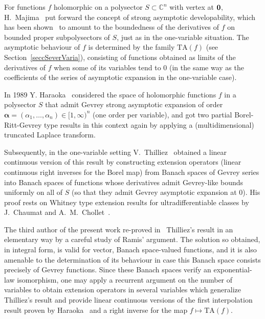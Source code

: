 \documentclass[11pt,a4paper,leqno]{article}
\theoremstyle{plain}
\theoremstyle{definition}
\def\C{\mathbb{C}}
\def\a{\alpha}
\def\balpha{\boldsymbol{\alpha}}
\begin{document}
For functions $f$ holomorphic on a polysector $S\subset\C^n$ with vertex at $\bf 0$, H.~Majima~\cite{Majima1,Majima2} put forward
the concept of strong asymptotic developability, which has been shown~\cite{hernandez,galindosanz} to amount to the boundedness of the
derivatives of $f$ on bounded proper subpolysectors of $S$, just as in the one-variable situation.
The asymptotic behaviour of $f$ is determined by the family $\mathrm{TA}(f)$ (see Section~\ref{seccSeverVaria}),
consisting of functions obtained as limits of the derivatives of $f$
when some of its variables tend to 0 (in the same way as the coefficients of the series of asymptotic expansion in the one-variable case).

In 1989 Y. Haraoka~\cite{Haraoka} considered the space of holomorphic functions $f$ in a polysector $S$ that admit Gevrey strong asymptotic expansion of order
$\balpha=(\a_1,\ldots,\a_n)\in[1,\infty)^n$ (one order per variable), and got two partial Borel-Ritt-Gevrey type results in this context again by applying a
(multidimensional) truncated Laplace transform.

Subsequently, in the one-variable setting V.~Thilliez~\cite[Theorem 1.3]{Thilliez1} obtained a linear continuous version of this result by constructing
extension operators (linear continuous right inverses for the Borel map) from Banach spaces of Gevrey series into Banach
spaces of functions whose derivatives admit Gevrey-like bounds uniformly on all of $S$ (so that they admit Gevrey asymptotic expansion at 0). His proof rests
on Whitney type extension results for ultradifferentiable classes by J.~Chaumat and A.~M.~Chollet~\cite{ChaumatChollet}.

The third author of the present work re-proved in~\cite{javier} Thilliez's result
in an elementary way by a careful study of Ramis' argument. The solution so obtained, in integral form,  is valid for vector, Banach space-valued functions, and it is also amenable to the determination of its
behaviour in case this Banach space consists precisely of Gevrey functions. Since these Banach spaces verify an exponential-law isomorphism, one may apply a recurrent argument on the number of variables to obtain extension operators in several variables which generalize Thilliez's result and provide linear continuous versions of the first interpolation result proven by Haraoka~\cite[Theorem 1.(1)]{Haraoka} and a right inverse for the map $f\mapsto\mathrm{TA}(f)$.
\end{document}
